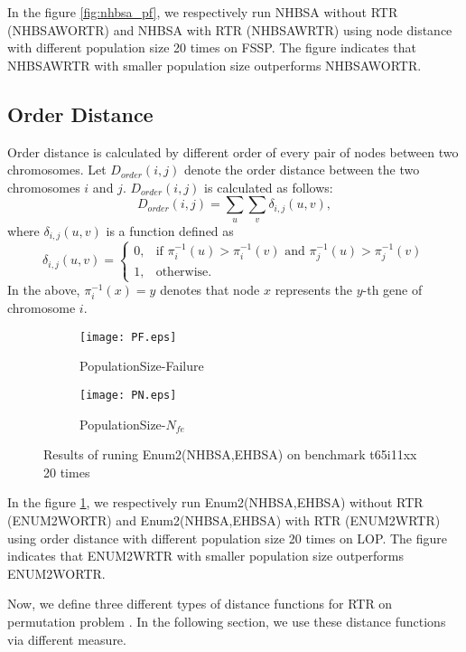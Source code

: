 In the figure \ref{fig:nhbsa_pf}, we respectively run NHBSA without RTR (NHBSAWORTR) and NHBSA with RTR (NHBSAWRTR) using node distance with different population size 20 times on FSSP.  The figure indicates that NHBSAWRTR with smaller population size outperforms NHBSAWORTR.


\subsection{Order Distance}
Order distance is calculated by different order of every pair of nodes between two chromosomes. Let $D_{order} (i,j)$ denote the order distance between the two chromosomes $i$ and $j$. $D_{order} (i,j)$ is calculated as follows:\[D_{order} (i,j)=\sum_u \sum_v \delta_{i,j}(u,v),\]
where $\delta_{i,j} (u,v)$ is a function defined as \[\delta_{i,j} (u,v)=
\begin{cases}
0,  & \mbox{if }\pi_i^{-1}(u)>\pi_i^{-1}(v)\mbox{ and } \pi_j^{-1}(u)>\pi_j^{-1}(v)  \\
1, & \mbox{otherwise.}
\end{cases}
\]
In the above, $\pi_i^{-1}(x)=y$ denotes that node $x$ represents the $y$-th gene of chromosome $i$.

\begin{figure}[htbp] 
        \centering
        \begin{subfigure}{0.45\textwidth}
            \texttt{[image: PF.eps]}
            \caption{PopulationSize-Failure} 
        \end{subfigure}
        \begin{subfigure}{0.45\textwidth} 
            \texttt{[image: PN.eps]}
            \caption{PopulationSize-$N_{fe}$}
        \end{subfigure}

        \caption{Results of runing Enum2(NHBSA,EHBSA) on benchmark t65i11xx 20 times} 
        \label{fig:enum2_pf}
\end{figure}

In the figure \ref{fig:enum2_pf}, we respectively run Enum2(NHBSA,EHBSA) without RTR (ENUM2WORTR) and Enum2(NHBSA,EHBSA) with RTR (ENUM2WRTR) using order distance with different population size 20 times on LOP.  The figure indicates that ENUM2WRTR with smaller population size outperforms ENUM2WORTR.


Now, we define three different types of distance functions for RTR on permutation problem . In the following section, we use these distance functions via different measure. 

